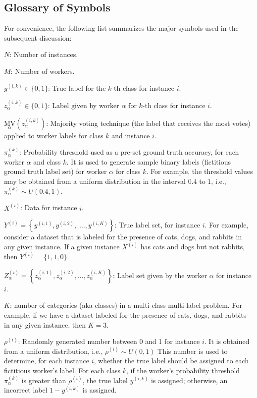 \documentclass[sn-nature]{bst/sn-jnl}
\begin{document}
\subsection{Glossary of Symbols}
For convenience, the following list summarizes the major symbols used in the subsequent discussion:
\begin{itemize}{
    \setlength{\parindent}{1.5em}
    \item  $N$: Number of instances.
    \item  $M$: Number of workers.
    \item  $y^{(i,k)} \in \{0,1\} $: True label for the $k $-th class for instance $i $.
    \item  $z_\alpha^{(i,k)} \in \{0,1\} $: Label given by worker $\alpha $ for $k $-th class for instance $i $.
    \item  ${{\underset\alpha{\mathrm{MV}}}{\left(z_\alpha^{(i,k)}\right)}} $: Majority voting technique (the label that receives the most votes) applied to worker labels for class $k $ and instance $i $.
    \item  $\pi_\alpha^{(k)} $: Probability threshold used as a pre-set ground truth accuracy, for each worker $\alpha$ and class $k$. It is used to generate sample binary labels (fictitious ground truth label set) for worker $\alpha $ for class $k $. For example, the threshold values may be obtained from a uniform distribution in the interval $0.4 $ to $1 $, i.e., $\pi_\alpha^{(k)} \sim U(0.4,1) $.
    \item  $X^{(i)} $: Data for instance $i$.
    \item  $Y^{(i)}=\left\{y^{(i,1)},y^{(i,2)},\;\dots,y^{(i,K)}\right\} $: True label set, for instance $i $. For example, consider a dataset that is labeled for the presence of cats, dogs, and rabbits in any given instance. If a given instance $X^{(i)} $ has cats and dogs but not rabbits, then $Y^{(i)}=\{1,1,0\} $.
    \item  $Z_{\alpha}^{(i)}=\left\{z_\alpha^{(i,1)}, z_\alpha^{(i,2)}, \dots, z_\alpha^{(i,K)}\right\} $: Label set given by the worker $\alpha $ for instance $i $.
    \item $K$: number of categories (aka classes) in a multi-class multi-label problem. For example, if we have a dataset labeled for the presence of cats, dogs, and rabbits in any given instance, then $K=3$.
    \item  $\rho^{(i)}$: Randomly generated number  between 0 and 1 for instance $i $. It is obtained from a uniform distribution, i.e., $\rho^{(i)} \sim U(0,1) $ This number is used to determine, for each instance $i$, whether the true label should be assigned to each fictitious worker's label. For each class $k$, if the worker's probability threshold $\pi_\alpha^{(k)}$ is greater than $\rho^{(i)}$, the true label $y^{(i,k)}$ is assigned; otherwise, an incorrect label $1 - y^{(i,k)}$  is assigned.
}
\end{itemize}
\end{document}

